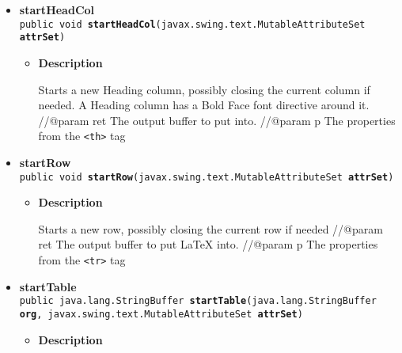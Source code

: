 \documentclass[11pt,a4paper]{report}
\begin{document}
{{\begin{itemize}
{\begin{itemize}
{Starts a new column, possibly closing the current column if needed //@param ret The output buffer to put \LaTeXe{} into. //@param p the properties from the \texttt{\small \textless td\textgreater } tag
}
\end{itemize}
}%
\item{ 
\hypertarget{org.stfm.texdoclet.TableInfo.startHeadCol(javax.swing.text.MutableAttributeSet)}{{\bf  startHeadCol}\\}
\texttt{public void\ {\bf  startHeadCol}(\texttt{javax.swing.text.MutableAttributeSet} {\bf  attrSet})
\label{org.stfm.texdoclet.TableInfo.startHeadCol(javax.swing.text.MutableAttributeSet)}}%
\begin{itemize}
\item{
{\bf  Description}

Starts a new Heading column, possibly closing the current column if needed. A Heading column has a Bold Face font directive around it. //@param ret The output buffer to put \LaTeXe{} into. //@param p The properties from the \texttt{\small \textless th\textgreater } tag
}
\end{itemize}
}%
\item{ 
\hypertarget{org.stfm.texdoclet.TableInfo.startRow(javax.swing.text.MutableAttributeSet)}{{\bf  startRow}\\}
\texttt{public void\ {\bf  startRow}(\texttt{javax.swing.text.MutableAttributeSet} {\bf  attrSet})
\label{org.stfm.texdoclet.TableInfo.startRow(javax.swing.text.MutableAttributeSet)}}%
\begin{itemize}
\item{
{\bf  Description}

Starts a new row, possibly closing the current row if needed //@param ret The output buffer to put \LaTeX{} into. //@param p The properties from the \texttt{\small \textless tr\textgreater } tag
}
\end{itemize}
}%
\item{ 
\hypertarget{org.stfm.texdoclet.TableInfo.startTable(java.lang.StringBuffer, javax.swing.text.MutableAttributeSet)}{{\bf  startTable}\\}
\texttt{public java.lang.StringBuffer\ {\bf  startTable}(\texttt{java.lang.StringBuffer} {\bf  org},
\texttt{javax.swing.text.MutableAttributeSet} {\bf  attrSet})
\label{org.stfm.texdoclet.TableInfo.startTable(java.lang.StringBuffer, javax.swing.text.MutableAttributeSet)}}%
\begin{itemize}
\item{
{\bf  Description}

}
\end{itemize}}
\end{itemize}}}
\end{document}
